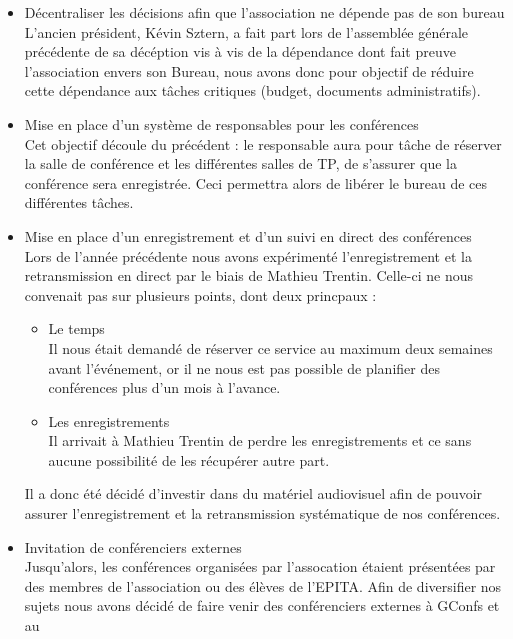 \documentclass[12pt]{report}
\begin{document}
  \begin{itemize}
    \item
      Décentraliser les décisions afin que l'association ne dépende pas de son
      bureau\\ L'ancien président, Kévin Sztern, a fait part lors de l'assemblée
      générale précédente de sa décéption vis à vis de la dépendance dont fait
      preuve l'association envers son Bureau, nous avons donc pour objectif de
      réduire cette dépendance aux tâches critiques (budget, documents
      administratifs).
    \item
      Mise en place d'un système de responsables pour les conférences\\ Cet
      objectif découle du précédent : le responsable aura pour tâche de réserver
      la salle de conférence et les différentes salles de TP, de s'assurer que
      la conférence sera enregistrée.  Ceci permettra alors de libérer le bureau
      de ces différentes tâches.
    \item
      Mise en place d'un enregistrement et d'un suivi en direct des
      conférences\\ Lors de l'année précédente nous avons expérimenté
      l'enregistrement et la retransmission en direct par le biais de Mathieu
      Trentin. Celle-ci ne nous convenait pas sur plusieurs points, dont deux
      princpaux :
      \begin{itemize}
        \item
          Le temps \\ Il nous était demandé de réserver ce service au maximum
          deux semaines avant l'événement, or il ne nous est pas possible de
          planifier des conférences plus d'un mois à l'avance.
        \item
          Les enregistrements \\ Il arrivait à Mathieu Trentin de perdre les
          enregistrements et ce sans aucune possibilité de les récupérer autre
          part.
      \end{itemize}
      Il a donc été décidé d'investir dans du matériel audiovisuel afin de
      pouvoir assurer l'enregistrement et la retransmission systématique de nos
      conférences.
    \item
      Invitation de conférenciers externes\\ Jusqu'alors, les conférences
      organisées par l'assocation étaient présentées par des membres de
      l'association ou des élèves de l'EPITA. Afin de diversifier nos sujets
      nous avons décidé de faire venir des conférenciers externes à GConfs et au

\end{itemize}
\end{document}
